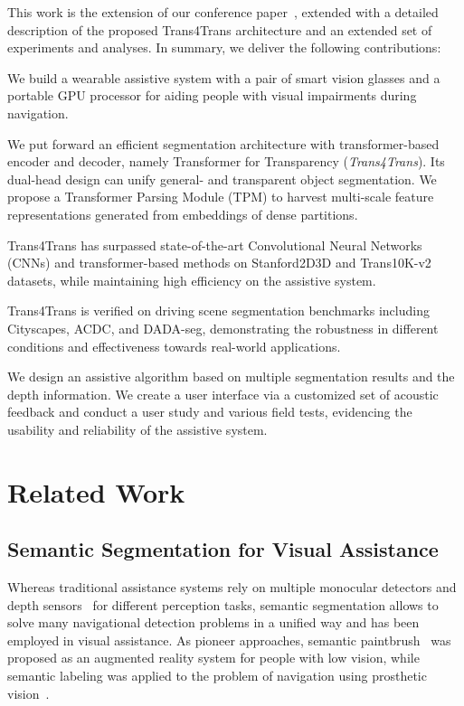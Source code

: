 \documentclass[journal]{IEEEtran}
\begin{document}
This work is the extension of our conference paper~\cite{zhang2021trans4trans}, extended with a detailed description of the proposed Trans4Trans architecture and an extended set of experiments and analyses. In summary, we deliver the following contributions:
\begin{compactitem}
    \item We build a wearable assistive system with a pair of smart vision glasses and a portable GPU processor
    for aiding people with visual impairments during navigation.
    \item We put forward an efficient segmentation architecture with transformer-based encoder and decoder, namely Transformer for Transparency (\emph{Trans4Trans}). Its dual-head design can unify general- and transparent object segmentation. We propose a Transformer Parsing Module (TPM) to harvest multi-scale feature representations generated from embeddings of dense partitions.
    \item Trans4Trans has surpassed state-of-the-art Convolutional Neural Networks (CNNs) and transformer-based methods on Stanford2D3D and Trans10K-v2 datasets, while maintaining high efficiency on the assistive system.
    \item Trans4Trans is verified on driving scene segmentation benchmarks including Cityscapes, ACDC, and DADA-seg, demonstrating the robustness in different conditions and effectiveness towards real-world applications.
    \item We design an assistive algorithm based on multiple segmentation results and the depth information. We create a user interface via a customized set of acoustic feedback and conduct a user study and various field tests, evidencing the usability and reliability of the assistive system.
\end{compactitem}

\section{Related Work}
\subsection{Semantic Segmentation for Visual Assistance}
Whereas traditional assistance systems rely on multiple monocular detectors and depth sensors~\cite{stahlschmidt2015descending,aladren2014navigation,wang2017enabling,dynamic_crosswalk} for different perception tasks, semantic segmentation allows to solve many navigational detection problems in a unified way and has been employed in visual assistance. As pioneer approaches, semantic paintbrush~\cite{miksik2015semantic} was proposed as an augmented reality system for people with low vision, while semantic labeling was applied to the problem of navigation using prosthetic vision~\cite{horne2016semantic}.
\end{document}
